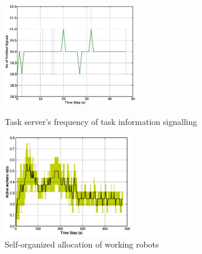 \documentclass{llncs}
\begin{document}
\begin{figure}
\begin{minipage}[t]{0.48\linewidth}
\centering
\includegraphics[height=4.5cm, angle=0]
{images/Global-SignalingFreqStat.eps}
\caption{\small Task server's frequency of task information signalling}
\label{fig:signal-frequency-stat}
%
\end{minipage}
\hspace{0.5cm}
\begin{minipage}[t]{0.48\linewidth}
\centering
\includegraphics[height=4.5cm, angle=0]{images/WorkerRatio.eps}
\caption{\small Self-organized allocation of working robots }
\label{fig:worker-stat} %
\end{minipage}
\end{figure}
\end{document}
